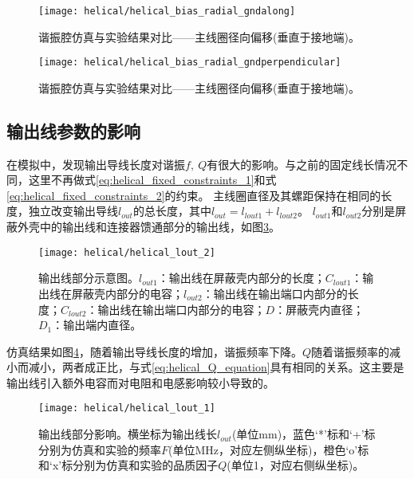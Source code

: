 \begin{figure}
    \centering
    \texttt{[image: helical/helical\_bias\_radial\_gndalong]}
    \caption[谐振腔仿真与实验结果对比——主线圈径向偏移(垂直于接地端)]{谐振腔仿真与实验结果对比——主线圈径向偏移(垂直于接地端)。\label{fig:helical_bias_radial_gndalong}}
\end{figure}

\begin{figure}
    \centering
    \texttt{[image: helical/helical\_bias\_radial\_gndperpendicular]}
    \caption[谐振腔仿真与实验结果对比——主线圈径向偏移(垂直于接地端)]{谐振腔仿真与实验结果对比——主线圈径向偏移(垂直于接地端)。\label{fig:helical_bias_radial_gndperpendicular}}
\end{figure}



\subsection[输出线参数的影响]{输出线参数的影响\label{section:helical_output_wire}}
在模拟中，发现输出导线长度对谐振$f,\ Q$有很大的影响。与之前的固定线长情况不同，这里不再做式\eqref{eq:helical_fixed_constraints_1}和式\eqref{eq:helical_fixed_constraints_2}的约束。
主线圈直径及其螺距保持在相同的长度，独立改变输出导线$l_{out}$的总长度，其中$l_{out} = l_{lout1} + l_{lout2}$。
$l_{out1}$和$l_{out2}$分别是屏蔽外壳中的输出线和连接器馈通部分的输出线，如图\ref{fig:helical_lout_2}。


\begin{figure}
    \centering
    \texttt{[image: helical/helical\_lout\_2]}
    \caption[输出线部分示意图]{输出线部分示意图。$l_{out1}$：输出线在屏蔽壳内部分的长度；$C_{lout1}$：输出线在屏蔽壳内部分的电容；$l_{out2}$：输出线在输出端口内部分的长度；$C_{lout2}$：输出线在输出端口内部分的电容；$D$：屏蔽壳内直径；$D_1$：输出端内直径。\label{fig:helical_lout_2}}
\end{figure}

仿真结果如图\ref{fig:helical_lout_1}，随着输出导线长度的增加，谐振频率下降。$Q$随着谐振频率的减小而减小，两者成正比，与式\eqref{eq:helical_Q_equation}具有相同的关系。这主要是输出线引入额外电容而对电阻和电感影响较小导致的。

\begin{figure}
    \centering
    \texttt{[image: helical/helical\_lout\_1]}
    \caption[输出线部分影响]{输出线部分影响。横坐标为输出线长$l_{out}$(单位mm)，蓝色‘*’标和‘+’标分别为仿真和实验的频率$F$(单位MHz，对应左侧纵坐标)，橙色‘o’标和‘x’标分别为仿真和实验的品质因子$Q$(单位1，对应右侧纵坐标)。\label{fig:helical_lout_1}}
\end{figure}

